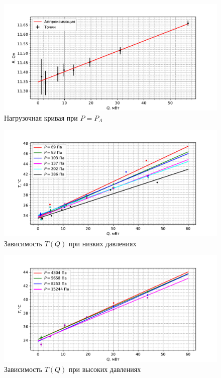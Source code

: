 \documentclass[12pt]{article}
\begin{document}
    \begin{figure}[H]
        \centering
        \includegraphics[width=\textwidth]{graphs/QR.pdf}
        \caption{Нагрузочная кривая при $P = P_A$}
    \end{figure}

    \begin{figure}[H]
        \centering
        \includegraphics[width=\textwidth]{graphs/QT_lowpress.pdf}
        \caption{Зависимость $T(Q)$ при низких давлениях}
    \end{figure}

    \begin{figure}[H]
        \centering
        \includegraphics[width=\textwidth]{graphs/QT_highpress.pdf}
        \caption{Зависимость $T(Q)$ при высоких давлениях}
    \end{figure}
\end{document}
